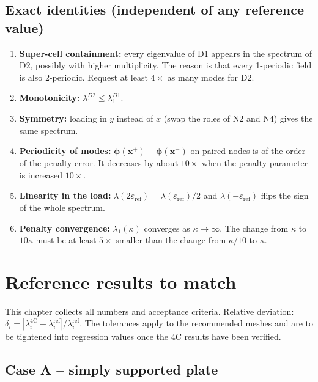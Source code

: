 \documentclass[11pt,a4paper]{report}
\begin{document}
\section{Exact identities (independent of any reference value)}
\begin{enumerate}[label=(I\arabic*)]
\item \textbf{Super-cell containment:} every eigenvalue of D1 appears in the
  spectrum of D2, possibly with higher multiplicity. The reason is that every
  1-periodic field is also 2-periodic. Request at least $4\times$ as many
  modes for D2.
\item \textbf{Monotonicity:} $\lambda_1^{D2}\le\lambda_1^{D1}$.
\item \textbf{Symmetry:} loading in $y$ instead of $x$ (swap the roles of N2
  and N4) gives the same spectrum.
\item \textbf{Periodicity of modes:} $\bm{\phi}(\bm{x}^+)-\bm{\phi}(\bm{x}^-)$
  on paired nodes is of the order of the penalty error. It decreases by about
  $10\times$ when the penalty parameter is increased $10\times$.
\item \textbf{Linearity in the load:} $\lambda(2\varepsilon_\text{ref}) =
  \lambda(\varepsilon_\text{ref})/2$ and $\lambda(-\varepsilon_\text{ref})$
  flips the sign of the whole spectrum.
\item \textbf{Penalty convergence:} $\lambda_1(\kappa)$ converges as
  $\kappa\to\infty$. The change from $\kappa$ to $10\kappa$ must be at least
  $5\times$ smaller than the change from $\kappa/10$ to $\kappa$.
\end{enumerate}

\chapter{Reference results to match}
\label{ch:results}

This chapter collects all numbers and acceptance criteria.
Relative deviation: $\delta_i = |\lambda_i^\text{4C}-\lambda_i^\text{ref}|/\lambda_i^\text{ref}$.
The tolerances apply to the recommended meshes and are to be tightened into
regression values once the 4C results have been verified.

\section{Case A -- simply supported plate}
\end{document}
